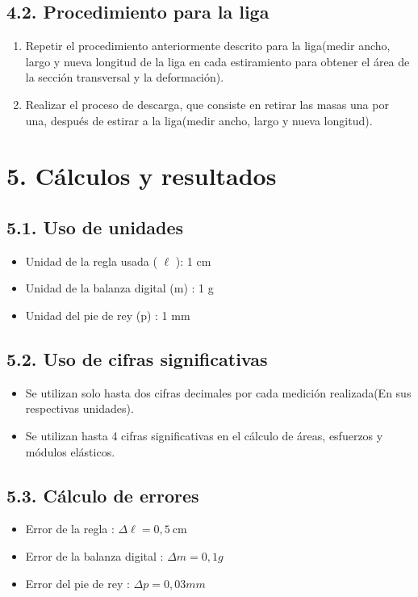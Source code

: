 \documentclass[10pt]{article}
\begin{document}
\subsection*{4.2. Procedimiento para la liga}
\begin{enumerate}
  \item Repetir el procedimiento anteriormente descrito para la liga(medir ancho, largo y nueva longitud de la liga en cada estiramiento para obtener el área de la sección transversal y la deformación).
  \item Realizar el proceso de descarga, que consiste en retirar las masas una por una, después de estirar a la liga(medir ancho, largo y nueva longitud).
\end{enumerate}

\section*{5. Cálculos y resultados}
\subsection*{5.1. Uso de unidades}
\begin{itemize}
  \item Unidad de la regla usada ( $\ell$ ): 1 cm
  \item Unidad de la balanza digital (m) : 1 g
  \item Unidad del pie de rey (p) : 1 mm
\end{itemize}

\subsection*{5.2. Uso de cifras significativas}
\begin{itemize}
  \item Se utilizan solo hasta dos cifras decimales por cada medición realizada(En sus respectivas unidades).
  \item Se utilizan hasta 4 cifras significativas en el cálculo de áreas, esfuerzos y módulos elásticos.
\end{itemize}

\subsection*{5.3. Cálculo de errores}
\begin{itemize}
  \item Error de la regla : $\Delta \ell=0,5 \mathrm{~cm}$
  \item Error de la balanza digital : $\Delta m=0,1 g$
  \item Error del pie de rey : $\Delta p=0,03 m m$
\end{itemize}
\end{document}
